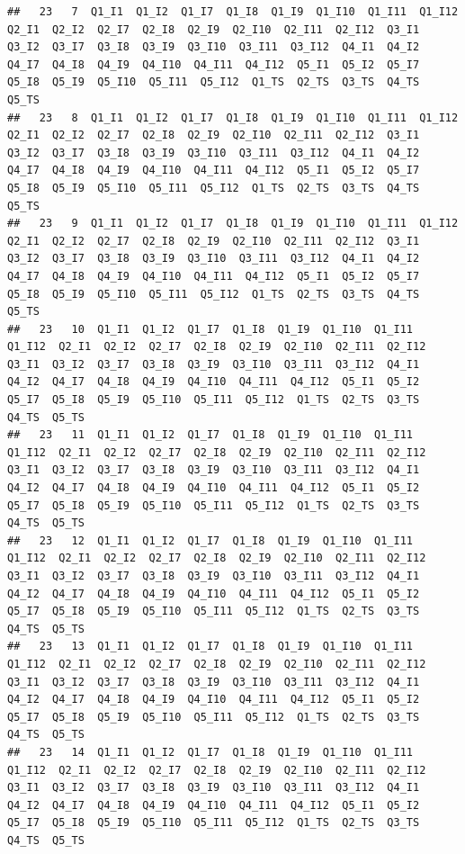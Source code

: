 \documentclass[]{book}
\begin{document}
\begin{verbatim}
##   23   7  Q1_I1  Q1_I2  Q1_I7  Q1_I8  Q1_I9  Q1_I10  Q1_I11  Q1_I12  Q2_I1  Q2_I2  Q2_I7  Q2_I8  Q2_I9  Q2_I10  Q2_I11  Q2_I12  Q3_I1  Q3_I2  Q3_I7  Q3_I8  Q3_I9  Q3_I10  Q3_I11  Q3_I12  Q4_I1  Q4_I2  Q4_I7  Q4_I8  Q4_I9  Q4_I10  Q4_I11  Q4_I12  Q5_I1  Q5_I2  Q5_I7  Q5_I8  Q5_I9  Q5_I10  Q5_I11  Q5_I12  Q1_TS  Q2_TS  Q3_TS  Q4_TS  Q5_TS
##   23   8  Q1_I1  Q1_I2  Q1_I7  Q1_I8  Q1_I9  Q1_I10  Q1_I11  Q1_I12  Q2_I1  Q2_I2  Q2_I7  Q2_I8  Q2_I9  Q2_I10  Q2_I11  Q2_I12  Q3_I1  Q3_I2  Q3_I7  Q3_I8  Q3_I9  Q3_I10  Q3_I11  Q3_I12  Q4_I1  Q4_I2  Q4_I7  Q4_I8  Q4_I9  Q4_I10  Q4_I11  Q4_I12  Q5_I1  Q5_I2  Q5_I7  Q5_I8  Q5_I9  Q5_I10  Q5_I11  Q5_I12  Q1_TS  Q2_TS  Q3_TS  Q4_TS  Q5_TS
##   23   9  Q1_I1  Q1_I2  Q1_I7  Q1_I8  Q1_I9  Q1_I10  Q1_I11  Q1_I12  Q2_I1  Q2_I2  Q2_I7  Q2_I8  Q2_I9  Q2_I10  Q2_I11  Q2_I12  Q3_I1  Q3_I2  Q3_I7  Q3_I8  Q3_I9  Q3_I10  Q3_I11  Q3_I12  Q4_I1  Q4_I2  Q4_I7  Q4_I8  Q4_I9  Q4_I10  Q4_I11  Q4_I12  Q5_I1  Q5_I2  Q5_I7  Q5_I8  Q5_I9  Q5_I10  Q5_I11  Q5_I12  Q1_TS  Q2_TS  Q3_TS  Q4_TS  Q5_TS
##   23   10  Q1_I1  Q1_I2  Q1_I7  Q1_I8  Q1_I9  Q1_I10  Q1_I11  Q1_I12  Q2_I1  Q2_I2  Q2_I7  Q2_I8  Q2_I9  Q2_I10  Q2_I11  Q2_I12  Q3_I1  Q3_I2  Q3_I7  Q3_I8  Q3_I9  Q3_I10  Q3_I11  Q3_I12  Q4_I1  Q4_I2  Q4_I7  Q4_I8  Q4_I9  Q4_I10  Q4_I11  Q4_I12  Q5_I1  Q5_I2  Q5_I7  Q5_I8  Q5_I9  Q5_I10  Q5_I11  Q5_I12  Q1_TS  Q2_TS  Q3_TS  Q4_TS  Q5_TS
##   23   11  Q1_I1  Q1_I2  Q1_I7  Q1_I8  Q1_I9  Q1_I10  Q1_I11  Q1_I12  Q2_I1  Q2_I2  Q2_I7  Q2_I8  Q2_I9  Q2_I10  Q2_I11  Q2_I12  Q3_I1  Q3_I2  Q3_I7  Q3_I8  Q3_I9  Q3_I10  Q3_I11  Q3_I12  Q4_I1  Q4_I2  Q4_I7  Q4_I8  Q4_I9  Q4_I10  Q4_I11  Q4_I12  Q5_I1  Q5_I2  Q5_I7  Q5_I8  Q5_I9  Q5_I10  Q5_I11  Q5_I12  Q1_TS  Q2_TS  Q3_TS  Q4_TS  Q5_TS
##   23   12  Q1_I1  Q1_I2  Q1_I7  Q1_I8  Q1_I9  Q1_I10  Q1_I11  Q1_I12  Q2_I1  Q2_I2  Q2_I7  Q2_I8  Q2_I9  Q2_I10  Q2_I11  Q2_I12  Q3_I1  Q3_I2  Q3_I7  Q3_I8  Q3_I9  Q3_I10  Q3_I11  Q3_I12  Q4_I1  Q4_I2  Q4_I7  Q4_I8  Q4_I9  Q4_I10  Q4_I11  Q4_I12  Q5_I1  Q5_I2  Q5_I7  Q5_I8  Q5_I9  Q5_I10  Q5_I11  Q5_I12  Q1_TS  Q2_TS  Q3_TS  Q4_TS  Q5_TS
##   23   13  Q1_I1  Q1_I2  Q1_I7  Q1_I8  Q1_I9  Q1_I10  Q1_I11  Q1_I12  Q2_I1  Q2_I2  Q2_I7  Q2_I8  Q2_I9  Q2_I10  Q2_I11  Q2_I12  Q3_I1  Q3_I2  Q3_I7  Q3_I8  Q3_I9  Q3_I10  Q3_I11  Q3_I12  Q4_I1  Q4_I2  Q4_I7  Q4_I8  Q4_I9  Q4_I10  Q4_I11  Q4_I12  Q5_I1  Q5_I2  Q5_I7  Q5_I8  Q5_I9  Q5_I10  Q5_I11  Q5_I12  Q1_TS  Q2_TS  Q3_TS  Q4_TS  Q5_TS
##   23   14  Q1_I1  Q1_I2  Q1_I7  Q1_I8  Q1_I9  Q1_I10  Q1_I11  Q1_I12  Q2_I1  Q2_I2  Q2_I7  Q2_I8  Q2_I9  Q2_I10  Q2_I11  Q2_I12  Q3_I1  Q3_I2  Q3_I7  Q3_I8  Q3_I9  Q3_I10  Q3_I11  Q3_I12  Q4_I1  Q4_I2  Q4_I7  Q4_I8  Q4_I9  Q4_I10  Q4_I11  Q4_I12  Q5_I1  Q5_I2  Q5_I7  Q5_I8  Q5_I9  Q5_I10  Q5_I11  Q5_I12  Q1_TS  Q2_TS  Q3_TS  Q4_TS  Q5_TS

\end{verbatim}
\end{document}
